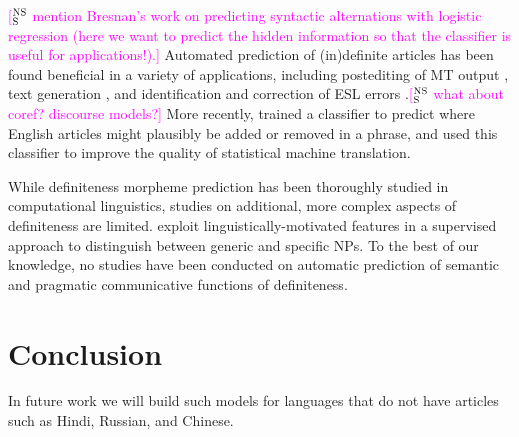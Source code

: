 \documentclass[11pt,letterpaper]{article}
\newcommand{\ensuretext}[1]{#1}
\newcommand{\nssmarker}{\ensuretext{\textcolor{magenta}{\ensuremath{^{\textsc{NS}}_{\textsc{S}}}}}}
\newcommand{\ytmarker}{\ensuretext{\textcolor{blue}{\ensuremath{^{\textsc{Y}}_{\textsc{T}}}}}}
\newcommand{\arkcomment}[3]{\ensuretext{\textcolor{#3}{[#1 #2]}}}
\newcommand{\nss}[1]{\arkcomment{\nssmarker}{#1}{magenta}}
\newcommand{\yt}[1]{\arkcomment{\ytmarker}{#1}{blue}}
\newcommand{\finalversion}[1]{}
\begin{document}
\nss{mention Bresnan's work on predicting syntactic alternations with logistic regression 
(here we want to predict the hidden information 
so that the classifier is useful for applications!).}
Automated prediction of (in)definite articles has been found beneficial in a variety of applications, 
including postediting of MT output \citep{knight1994automated}, text generation \citep{DBLP:conf/aaai/Elhadad93,minnen2000memory}, 
and identification and correction of ESL errors  \citep{aehan2006detecting,de2008classifier,gamon2008,rozovskaya2010training}.\nss{what about coref? discourse models?} 
More recently, \citet{tsvetkov13} trained a classifier to predict where English articles might plausibly be added or removed in a phrase, 
and used this classifier to improve the quality of statistical machine translation. 

While definiteness morpheme prediction has been thoroughly studied in computational linguistics, 
studies on additional, more complex aspects of definiteness are limited.  
\citet{reiter10}  exploit linguistically-motivated features in a supervised approach to 
distinguish between generic and specific NPs.\finalversion{\yt{what else?}}
To the best of our knowledge, no studies have been conducted 
on automatic prediction of semantic and pragmatic communicative functions of definiteness.  


\section{Conclusion}\label{sec:conclusion}

In future work we will build such models for languages that do not have articles such as Hindi, Russian, and Chinese.





\setlength{\bibsep}{10pt}
{\fontsize{10}{12.25}\selectfont
}
\end{document}
